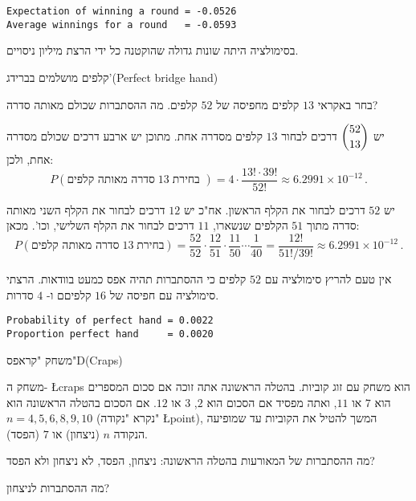\sml{}
\begin{verbatim}
Expectation of winning a round = -0.0526
Average winnings for a round   = -0.0593
\end{verbatim}
בסימולציה היתה שונות גדולה שהוקטנה כל ידי הרצת מיליון ניסויים.


\begin{prob}{קלפים מושלמים בברידג'}{}{(Perfect bridge hand)}

בחר באקראי 
$13$
קלפים מחפיסה של 
$52$
קלפים. מה ההסתברות שכולם מאותה סדרה?
\end{prob}


יש
$\displaystyle{52 \choose 13}$
דרכים לבחור 
$13$
קלפים מסדרה אחת. מתוכן יש ארבע דרכים שכולם מסדרה אחת, ולכן:
\[
P(\textrm{סדרה מאותה קלפים}\;13\;\textrm{בחירת })=4\cdot \frac{13! \cdot 39!}{52!}\approx 6.2991\times 10^{-12}\,.
\]


יש 
$52$
דרכים לבחור את הקלף הראשון. אח"כ יש 
$12$
דרכים לבחור את הקלף השני מאותה סדרה מתוך 
$51$
הקלפים שנשארו,
$11$
דרכים לבחור את הקלף השלישי, וכו'. מכאן:
\[
P(\textrm{סדרה מאותה קלפים}\;13\;\textrm{בחירת})=\frac{52}{52}\cdot \frac{12}{51}\cdot \frac{11}{50} \cdots  \frac{1}{40}= \frac{12!}{51!/39!}\approx 6.2991\times 10^{-12}\,.
\]

\sml{}

אין טעם להריץ סימולציה עם 
$52$
קלפים כי ההסתברות תהיה אפס כמעט בוודאות. הרצתי סימולציה עם חפיסה של 
$16$
קלפיםם ו-%
$4$
סדרות.
\begin{verbatim}
Probability of perfect hand = 0.0022
Proportion perfect hand     = 0.0020
\end{verbatim}


\begin{prob}{משחק "קראפס"}{D}{(Craps)}

משחק ה-%
\L{craps}
הוא משחק עם זוג קוביות. בהטלה הראשונה אתה זוכה אם סכום המספרים הוא
$7$
או
$11$,
ואתה מפסיד אם הסכום הוא
$2$, $3$
או
$12$.
אם הסכום בהטלה הראשונה הוא
$n=4,5,6,8,9,10$ 
(נקרא "נקודה" 
\L{point}),
המשך להטיל את הקוביות עד שמופיעה הנקודה 
$n$
(ניצחון) או 
$7$
(הפסד).

מה ההסתברות של המאורעות בהטלה הראשונה: ניצחון, הפסד, לא ניצחון ולא הפסד?

מה ההסתברות לניצחון?
\end{prob}

